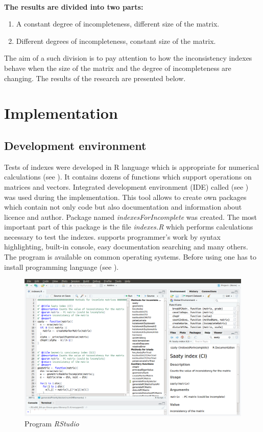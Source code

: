 \\
\textbf{The results are divided into two parts:}
\begin{enumerate}
  \item A constant degree of incompleteness, different size of the matrix.
  \item Different degrees of incompleteness, constant size of the matrix.
\end{enumerate}

The aim of a such division is to pay attention to how the inconsistency indexes behave when the size of the matrix and the degree of incompleteness are changing. The results of the research are presented below.


\section{Implementation}

\subsection{Development environment}
Tests of indexes were developed in R language which is appropriate for numerical calculations (see \cite{projectR}). It contains dozens of functions which support operations on matrices and vectors. Integrated development environment (IDE) called  (see \cite{studioR}) was used during the implementation. This tool allows to create own packages which contain not only code but also documentation and information about licence and author. Package named \textit{indexesForIncomplete} was created. The most important part of this package is the file \textit{indexes.R} which performs calculations necessary to test the indexes.  supports programmer's work by syntax highlighting, built-in console, easy documentation searching and many others. The program is available on common operating systems. Before using  one has to install  programming language (see \cite{installR}).  



\begin{figure}[h]
\centerline{\includegraphics[width=\textwidth]{images/rstudio.png}}
\caption{Program \textit{RStudio}}
\label{fig:rstudio}
\end{figure}

